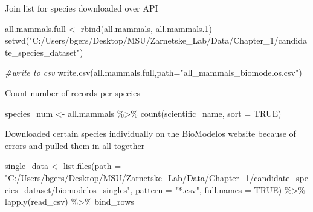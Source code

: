 \documentclass[
]{article}
\newenvironment{Shaded}{\begin{snugshade}}{\end{snugshade}}
\newcommand{\AttributeTok}[1]{\textcolor[rgb]{0.77,0.63,0.00}{#1}}
\newcommand{\CommentTok}[1]{\textcolor[rgb]{0.56,0.35,0.01}{\textit{#1}}}
\newcommand{\ConstantTok}[1]{\textcolor[rgb]{0.00,0.00,0.00}{#1}}
\newcommand{\FloatTok}[1]{\textcolor[rgb]{0.00,0.00,0.81}{#1}}
\newcommand{\FunctionTok}[1]{\textcolor[rgb]{0.00,0.00,0.00}{#1}}
\newcommand{\NormalTok}[1]{#1}
\newcommand{\OtherTok}[1]{\textcolor[rgb]{0.56,0.35,0.01}{#1}}
\newcommand{\SpecialCharTok}[1]{\textcolor[rgb]{0.00,0.00,0.00}{#1}}
\newcommand{\StringTok}[1]{\textcolor[rgb]{0.31,0.60,0.02}{#1}}
\begin{document}
Join list for species downloaded over API

\begin{Shaded}
\begin{Highlighting}[]
\NormalTok{all.mammals.full }\OtherTok{\textless{}{-}} \FunctionTok{rbind}\NormalTok{(all.mammals, all.mammals}\FloatTok{.1}\NormalTok{)}
\FunctionTok{setwd}\NormalTok{(}\StringTok{"C:/Users/bgers/Desktop/MSU/Zarnetske\_Lab/Data/Chapter\_1/candidate\_species\_dataset"}\NormalTok{)}

\CommentTok{\#write to csv}
\FunctionTok{write.csv}\NormalTok{(all.mammals.full,}\AttributeTok{path=}\StringTok{"all\_mammals\_biomodelos.csv"}\NormalTok{)}
\end{Highlighting}
\end{Shaded}

Count number of records per species

\begin{Shaded}
\begin{Highlighting}[]
\NormalTok{species\_num }\OtherTok{\textless{}{-}}\NormalTok{ all.mammals }\SpecialCharTok{\%\textgreater{}\%}
  \FunctionTok{count}\NormalTok{(scientific\_name, }\AttributeTok{sort =} \ConstantTok{TRUE}\NormalTok{) }
\end{Highlighting}
\end{Shaded}

Downloaded certain species individually on the BioModelos website
because of errors and pulled them in all together

\begin{Shaded}
\begin{Highlighting}[]
\NormalTok{single\_data }\OtherTok{\textless{}{-}} \FunctionTok{list.files}\NormalTok{(}\AttributeTok{path =} \StringTok{"C:/Users/bgers/Desktop/MSU/Zarnetske\_Lab/Data/Chapter\_1/candidate\_species\_dataset/biomodelos\_singles"}\NormalTok{,    }
                       \AttributeTok{pattern =} \StringTok{"*.csv"}\NormalTok{, }\AttributeTok{full.names =} \ConstantTok{TRUE}\NormalTok{) }\SpecialCharTok{\%\textgreater{}\%} 
  \FunctionTok{lapply}\NormalTok{(read\_csv) }\SpecialCharTok{\%\textgreater{}\%}                                           
\NormalTok{  bind\_rows                                                      }
\end{Highlighting}
\end{Shaded}
\end{document}
